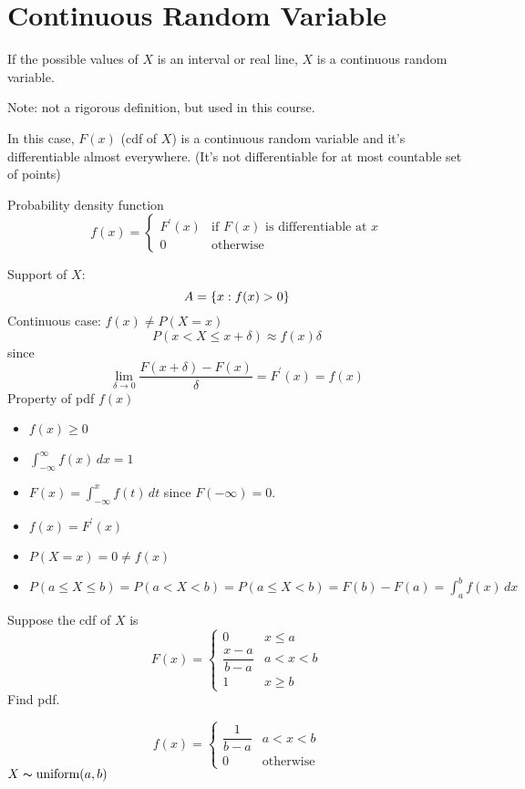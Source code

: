 \section{Continuous Random Variable}
\begin{Definition}{}{}
    If the possible values of $ X $ is an interval or real line,
    $ X $ is a continuous random variable.
\end{Definition}
Note: not a rigorous definition, but used in this course.

In this case, $ F(x) $ (cdf of $ X $) is a continuous random variable
and it's differentiable almost everywhere. (It's not differentiable
for at most countable set of points)

\begin{Definition}{Probability density function}{}
    \[ f(x)=\begin{cases}
            F^\prime(x) & \text{if }F(x)\text{ is differentiable at }x \\
            0           & \text{otherwise}
        \end{cases} \]
\end{Definition}
Support of $ X $:
\[ A=\{x:f(x)>0\} \]
Continuous case: $ f(x)\neq P(X=x) $
\[ P(x<X\leqslant x+\delta)\approx f(x)\delta \]
since
\[ \lim\limits_{{\delta} \to {0}}\frac{F(x+\delta)-F(x)}{\delta}=F^\prime(x)=f(x) \]
Property of pdf $ f(x) $
\begin{itemize}
    \item $ f(x)\geqslant 0 $
    \item $ \int_{-\infty}^{\infty} f(x)\, d{x} =1 $
    \item $ F(x)=\int_{-\infty}^{x} f(t)\, d{t} $
          since $ F(-\infty)=0 $.
    \item $ f(x)=F^\prime(x) $
    \item $ P(X=x)=0\neq f(x) $
    \item $ P(a\leqslant X\leqslant b)=P(a<X<b)=P(a\leqslant X<b)=F(b)-F(a)
              =\int_{a}^{b} f(x)\, d{x}  $
\end{itemize}

\begin{Example}{}{}
    Suppose the cdf of $ X $ is
    \[ F(x)=\begin{cases}
            0                & x\leqslant a \\
            \dfrac{x-a}{b-a} & a<x<b        \\
            1                & x\geqslant b
        \end{cases} \]
    Find pdf.

    \[ f(x)=
        \begin{cases}
            \dfrac{1}{b-a} & a<x<b            \\
            0              & \text{otherwise}
        \end{cases} \]
    $ X \thicksim \text{uniform}(a,b) $
\end{Example}

